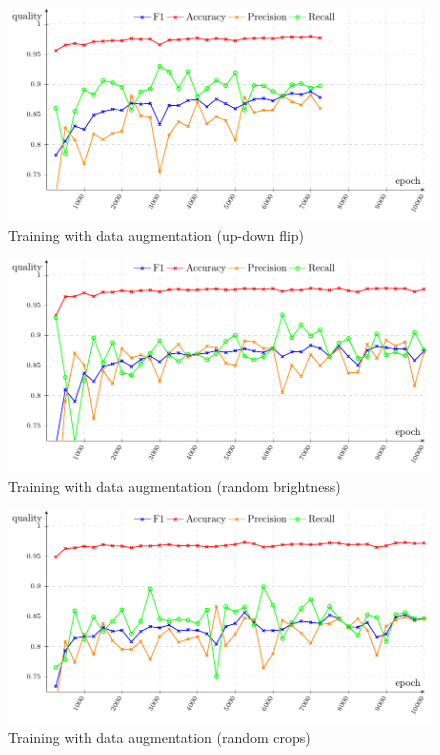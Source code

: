 \begin{appendices}
\begin{figure}[ht]
    \centering
    \includegraphics[width=\linewidth]{csv-line-plot/5xxx-ud-flip.pdf}
    \caption{Training with data augmentation (up-down flip)}
    \label{fig:graph-training-ud-flip}
\end{figure}

\begin{figure}[ht]
    \centering
    \includegraphics[width=\linewidth]{csv-line-plot/10000-random-brightnes.pdf}
    \caption{Training with data augmentation (random brightness)}
    \label{fig:graph-training-ud-flip}
\end{figure}

\begin{figure}[ht]
    \centering
    \includegraphics[width=\linewidth]{csv-line-plot/10000-random-crops.pdf}
    \caption{Training with data augmentation (random crops)}
    \label{fig:graph-training-ud-flip}
\end{figure}


\end{appendices}
